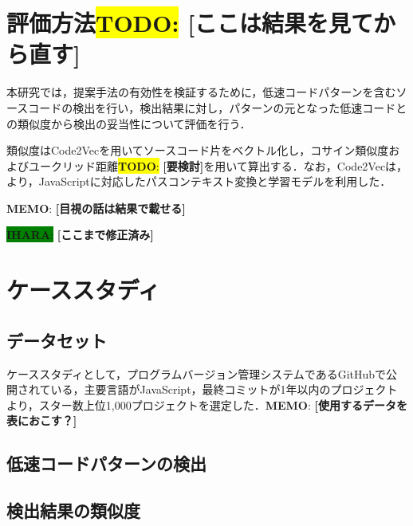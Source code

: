 \documentclass[submit,techrep,noauthor]{ipsj}
\newcommand{\todo}[1]{\colorbox{yellow}{{\bf TODO}:}{\color{red} {\textbf{[#1]}}}}
\newcommand{\memo}[1]{\colorbox{magenta!30}{{\bf MEMO}:}{\color{red!50} {\textbf{[#1]}}}}
\newcommand{\ihara}[1]{\colorbox{green}{{\bf IHARA}:}{\color{blue} {\textbf{[#1]}}}}
\begin{document}
\section{評価方法\todo{ここは結果を見てから直す}}

本研究では，提案手法の有効性を検証するために，低速コードパターンを含むソースコードの検出を行い，検出結果に対し，パターンの元となった低速コードとの類似度から検出の妥当性について評価を行う．

類似度はCode2Vec\cite{code2vec}を用いてソースコード片をベクトル化し，コサイン類似度およびユークリッド距離\todo{要検討}を用いて算出する．なお，Code2Vecは，\cite{saiki}より，JavaScriptに対応したパスコンテキスト変換と学習モデルを利用した．

\memo{目視の話は結果で載せる}


\ihara{ここまで修正済み}

\section{ケーススタディ}
\label{sec:case-study}

\subsection{データセット}

ケーススタディとして，プログラムバージョン管理システムであるGitHubで公開されている，主要言語がJavaScript，最終コミットが1年以内のプロジェクトより，スター数上位1,000プロジェクトを選定した．\memo{使用するデータを表におこす？}

\subsection{低速コードパターンの検出}


\subsection{検出結果の類似度}
\end{document}
